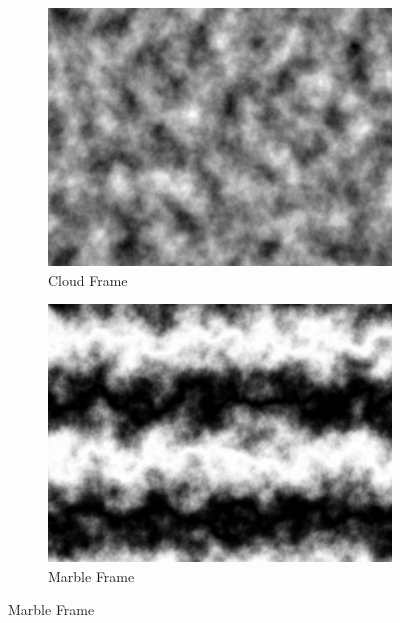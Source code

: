 \documentclass[11pt,a4paper]{article}
\begin{document}
\begin{figure}
	\begin{subfigure}[t]{0.35\textwidth}
	\includegraphics[width=1\textwidth]{cloud.png}
	\caption{Cloud Frame}
	\end{subfigure}
	\hspace{1em}
	\begin{subfigure}[t]{0.35\textwidth}
	\includegraphics[width=1\textwidth]{marble.png}
	\caption{Marble Frame}
	\end{subfigure}	
	
	\vspace{1em}
	

\end{figure}
\end{document}
